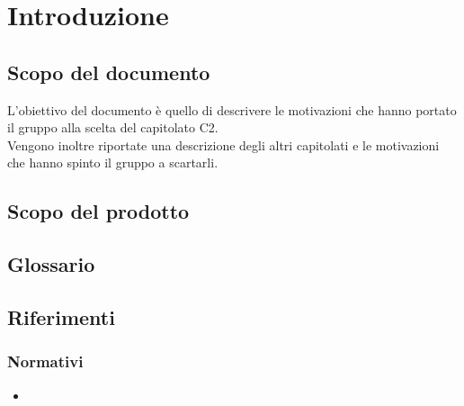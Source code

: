 \section {Introduzione}
	\subsection {Scopo del documento}
		L'obiettivo del documento è quello di descrivere le motivazioni che hanno portato il gruppo \GRUPPO{} alla scelta del capitolato C2.  \\
		Vengono inoltre riportate una descrizione degli altri capitolati e le motivazioni che hanno spinto il gruppo a scartarli.
	\subsection {Scopo del prodotto}
		\SCOPO
	\subsection {Glossario}
		\GLOSSARIO
	\subsection {Riferimenti}
		\subsubsection {Normativi}
			\begin {itemize}
				\item \NPdoc
			\end {itemize}
